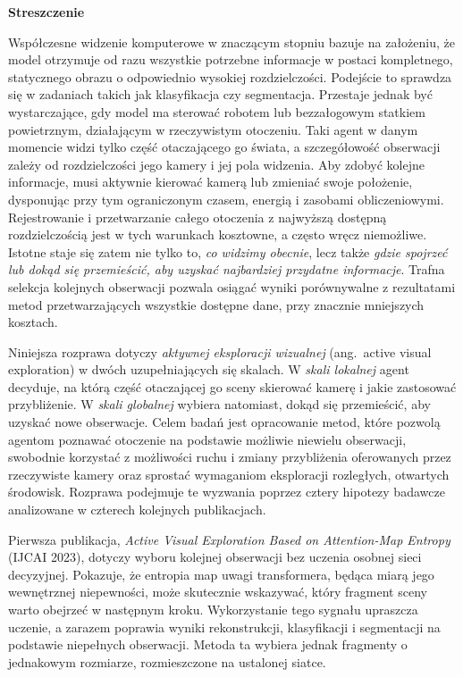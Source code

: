 \clearpage
\begin{polish}
\begin{center}
    {\large\bfseries Streszczenie}
\end{center}
\vspace{1em}

Współczesne widzenie komputerowe w znaczącym stopniu bazuje na założeniu, że model otrzymuje od razu wszystkie potrzebne informacje w postaci kompletnego, statycznego obrazu o odpowiednio wysokiej rozdzielczości. Podejście to sprawdza się w zadaniach takich jak klasyfikacja czy segmentacja. Przestaje jednak być wystarczające, gdy model ma sterować robotem lub bezzałogowym statkiem powietrznym, działającym w rzeczywistym otoczeniu. Taki agent w danym momencie widzi tylko część otaczającego go świata, a szczegółowość obserwacji zależy od rozdzielczości jego kamery i jej pola widzenia. Aby zdobyć kolejne informacje, musi aktywnie kierować kamerą lub zmieniać swoje położenie, dysponując przy tym ograniczonym czasem, energią i zasobami obliczeniowymi. Rejestrowanie i przetwarzanie całego otoczenia z najwyższą dostępną rozdzielczością jest w tych warunkach kosztowne, a często wręcz niemożliwe. Istotne staje się zatem nie tylko to, \emph{co widzimy obecnie}, lecz także \emph{gdzie spojrzeć lub dokąd się przemieścić, aby uzyskać najbardziej przydatne informacje}. Trafna selekcja kolejnych obserwacji pozwala osiągać wyniki porównywalne z rezultatami metod przetwarzających wszystkie dostępne dane, przy znacznie mniejszych kosztach.

Niniejsza rozprawa dotyczy \emph{aktywnej eksploracji wizualnej} (ang.\ active visual exploration) w dwóch uzupełniających się skalach. W \emph{skali lokalnej} agent decyduje, na którą część otaczającej go sceny skierować kamerę i jakie zastosować przybliżenie. W \emph{skali globalnej} wybiera natomiast, dokąd się przemieścić, aby uzyskać nowe obserwacje. Celem badań jest opracowanie metod, które pozwolą agentom poznawać otoczenie na podstawie możliwie niewielu obserwacji, swobodnie korzystać z możliwości ruchu i zmiany przybliżenia oferowanych przez rzeczywiste kamery oraz sprostać wymaganiom eksploracji rozległych, otwartych środowisk. Rozprawa podejmuje te wyzwania poprzez cztery hipotezy badawcze analizowane w czterech kolejnych publikacjach.

Pierwsza publikacja, \emph{Active Visual Exploration Based on Attention-Map Entropy} (IJCAI 2023), dotyczy wyboru kolejnej obserwacji bez uczenia osobnej sieci decyzyjnej. Pokazuje, że entropia map uwagi transformera, będąca miarą jego wewnętrznej niepewności, może skutecznie wskazywać, który fragment sceny warto obejrzeć w następnym kroku. Wykorzystanie tego sygnału upraszcza uczenie, a zarazem poprawia wyniki rekonstrukcji, klasyfikacji i segmentacji na podstawie niepełnych obserwacji. Metoda ta wybiera jednak fragmenty o jednakowym rozmiarze, rozmieszczone na ustalonej siatce.


\end{polish}
